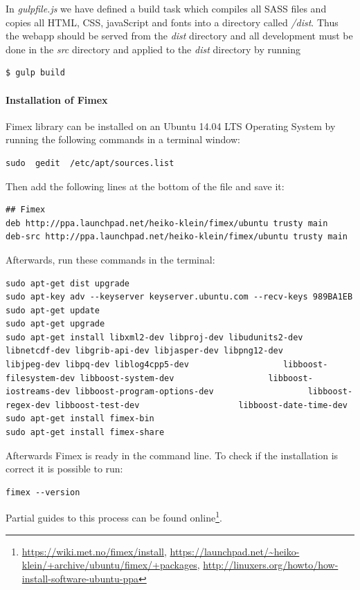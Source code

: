 \documentclass[11pt,a4paper,titlepage,oneside]{report}
\begin{document}
In \emph{gulpfile.js} we have defined a build task which compiles all \gls{SASS} files and copies all \gls{HTML}, \gls{CSS}, javaScript and fonts into a directory called \emph{/dist}. \newline
Thus the webapp should be served from the \emph{dist} directory and all development must be done in the \emph{src} directory and applied to the \emph{dist} directory by running

\begin{lstlisting}
$ gulp build
\end{lstlisting}

\paragraph{Installation of Fimex}
Fimex library can be installed on an Ubuntu 14.04 LTS Operating System by running the following commands in a terminal window:
\begin{lstlisting}
sudo  gedit  /etc/apt/sources.list
\end{lstlisting}
Then add the following lines at the bottom of the file and save it:
\begin{lstlisting}
## Fimex
deb http://ppa.launchpad.net/heiko-klein/fimex/ubuntu trusty main
deb-src http://ppa.launchpad.net/heiko-klein/fimex/ubuntu trusty main
\end{lstlisting}
Afterwards, run these commands in the terminal:
\begin{lstlisting}
sudo apt-get dist upgrade
sudo apt-key adv --keyserver keyserver.ubuntu.com --recv-keys 989BA1EB
sudo apt-get update
sudo apt-get upgrade
sudo apt-get install libxml2-dev libproj-dev libudunits2-dev                    libnetcdf-dev libgrib-api-dev libjasper-dev libpng12-dev                    libjpeg-dev libpq-dev liblog4cpp5-dev                   libboost-filesystem-dev libboost-system-dev                   libboost-iostreams-dev libboost-program-options-dev                   libboost-regex-dev libboost-test-dev                    libboost-date-time-dev
sudo apt-get install fimex-bin
sudo apt-get install fimex-share
\end{lstlisting} 

Afterwards Fimex is ready in the command line. To check if the installation is correct it is possible to run:
\begin{lstlisting}
fimex --version
\end{lstlisting}

Partial guides to this process can be found online\footnote{\url{https://wiki.met.no/fimex/install}, 
\url{https://launchpad.net/~heiko-klein/+archive/ubuntu/fimex/+packages}, 
\url{http://linuxers.org/howto/how-install-software-ubuntu-ppa}}.
\end{document}

